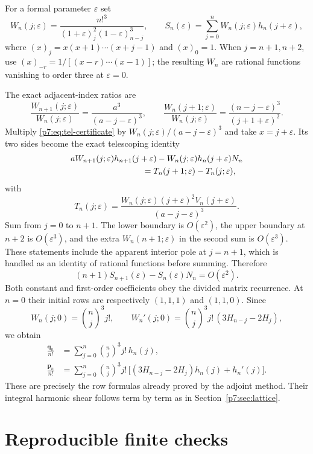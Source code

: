 \documentclass[11pt,a4paper]{article}
\theoremstyle{definition}
\theoremstyle{remark}
\numberwithin{equation}{section}
\begin{document}
For a formal parameter $\varepsilon$ set
\[
 W_n(j;\varepsilon)
 =\frac{n!^3}{(1+\varepsilon)_j^2(1-\varepsilon)_{n-j}^3},
 \qquad
 S_n(\varepsilon)
 =\sum_{j=0}^n W_n(j;\varepsilon)h_n(j+\varepsilon),
\]
where $(x)_j=x(x+1)\cdots(x+j-1)$ and $(x)_0=1$.
When $j=n+1,n+2$, use
$(x)_{-r}=1/[(x-r)\cdots(x-1)]$; the resulting $W_n$ are rational
functions vanishing to order three at $\varepsilon=0$.

The exact adjacent-index ratios are
\[
 \frac{W_{n+1}(j;\varepsilon)}{W_n(j;\varepsilon)}
 =\frac{a^3}{(a-j-\varepsilon)^3},\qquad
 \frac{W_n(j+1;\varepsilon)}{W_n(j;\varepsilon)}
 =\frac{(n-j-\varepsilon)^3}{(j+1+\varepsilon)^2}.
\]
Multiply \eqref{p7:eq:tel-certificate} by
$W_n(j;\varepsilon)/(a-j-\varepsilon)^3$ and take
$x=j+\varepsilon$. Its two sides become the exact telescoping identity
\begin{align*}
 &aW_{n+1}(j;\varepsilon)h_{n+1}(j+\varepsilon)
  -W_n(j;\varepsilon)h_n(j+\varepsilon)N_n\\
 &\hspace{30mm}=T_n(j+1;\varepsilon)-T_n(j;\varepsilon),
\end{align*}
with
\[
 T_n(j;\varepsilon)=
 \frac{W_n(j;\varepsilon)(j+\varepsilon)^2
                  V_n(j+\varepsilon)}
      {(a-j-\varepsilon)^3}.
\]
Sum from $j=0$ to $n+1$. The lower boundary is $O(\varepsilon^2)$,
the upper boundary at $n+2$ is $O(\varepsilon^3)$, and the extra
$W_n(n+1;\varepsilon)$ in the second sum is $O(\varepsilon^3)$.
These statements include the apparent interior pole at $j=n+1$,
which is handled as an identity of rational functions before summing.
Therefore
\[
 (n+1)S_{n+1}(\varepsilon)-S_n(\varepsilon)N_n
 =O(\varepsilon^2).
\]
Both constant and first-order coefficients obey the divided matrix
recurrence. At $n=0$ their initial rows are respectively
$(1,1,1)$ and $(1,1,0)$. Since
\[
 W_n(j;0)=\binom nj^3j!,\qquad
 W_n'(j;0)=\binom nj^3j!\,(3H_{n-j}-2H_j),
\]
we obtain
\begin{align*}
 \frac{\mathbf q_n}{n!}
 &=\sum_{j=0}^n\binom nj^3j!\,h_n(j),\\
 \frac{\mathbf p_n}{n!}
 &=\sum_{j=0}^n\binom nj^3j!\,
   \bigl[(3H_{n-j}-2H_j)h_n(j)+h_n'(j)\bigr].
\end{align*}
These are precisely the row formulas already proved by the adjoint
method. Their integral harmonic shear follows term by term as in
Section~\ref{p7:sec:lattice}.



\section{Reproducible finite checks}
\label{p7:app:computation}
\end{document}
